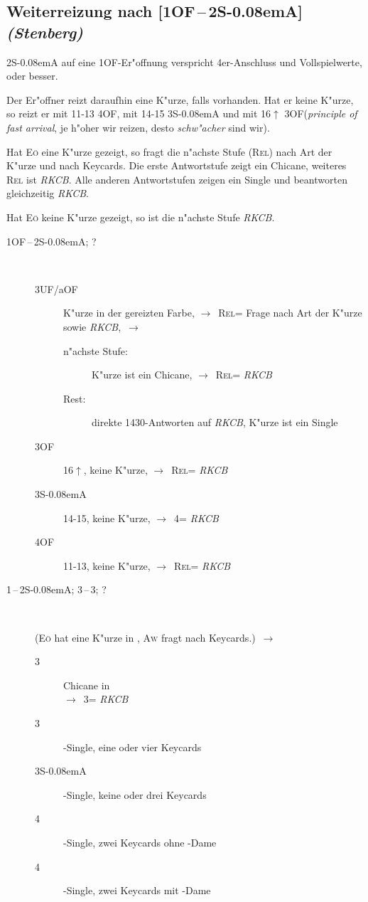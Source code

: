 \documentclass[11pt,german,twocolumn]{scrartcl}
\def\pik{\nobreak\hspace{\cardskip}\Sp\xspace}
\def\coe{\nobreak\hspace{\cardskip}\He\xspace}
\def\kar{\nobreak\hspace{\cardskip}\Di\xspace}
\def\tre{\nobreak\hspace{\cardskip}\Cl\xspace}
\def\co{\He\xspace}
\def\tr{\Cl\xspace}
\def\ra{$\rightarrow$\xspace}
\def\pl{$\uparrow$\xspace}
\def\uf{\nobreak\hspace{\cardskip}\textsf{UF}\xspace}
\def\of{\nobreak\hspace{\cardskip}\textsf{OF}\xspace}
\def\aof{\nobreak\hspace{\cardskip}\textsf{aOF}\xspace}
\def\sa{\nobreak\textsf{S\kern-0.08emA}\xspace}
\def\SA{\nobreak\hspace{\cardskip}\sa}
\def\sep{\,--\,}
\newcommand{\conv}[1]{\emph{#1}}
\def\rel{\textsc{Rel}\xspace}
\def\aw{\textsc{Aw}\xspace}
\def\eo{\textsc{E\"o}\xspace}
\def\bdsc{\begin{description}}
\def\edsc{\end{description}}
\begin{document}
\subsection{Weiterreizung nach [1\of{}\sep2\SA] \conv{(Stenberg)}\label{stenberg}}

2\SA auf eine 1\of-Er"offnung verspricht 4er-Anschluss und
Vollspielwerte, oder besser.

Der Er"offner reizt daraufhin eine K"urze, falls vorhanden. Hat er
keine K"urze, so reizt er mit 11-13 4\of, mit 14-15 3\SA und mit
16\pl 3\of (\conv{principle of fast arrival}, je h"oher wir reizen,
desto \emph{schw"acher} sind wir).

Hat \eo eine K"urze gezeigt, so fragt die n"achste Stufe (\rel) nach
Art der K"urze und nach Keycards.  Die erste Antwortstufe zeigt ein
Chicane, weiteres \rel ist \conv{RKCB}.  Alle anderen Antwortstufen
zeigen ein Single und beantworten gleichzeitig \conv{RKCB}.

Hat \eo keine K"urze gezeigt, so ist die n"achste Stufe \conv{RKCB}.

\bdsc
\item[1\of{}\sep2\SA; ?]~
  \bdsc
  \item[3\uf/\aof] K"urze in der gereizten Farbe, \ra~\rel = Frage
    nach Art der K"urze sowie \conv{RKCB},~\ra
    \bdsc
    \item[n"achste Stufe:] K"urze ist ein Chicane, \ra~\rel = \conv{RKCB}
    \item[Rest:] direkte 1430-Antworten auf
      \conv{RKCB}, K"urze ist ein Single
    \edsc
  \item[3\of] 16\pl, keine K"urze, \ra~\rel = \conv{RKCB}
  \item[3\SA] 14-15, keine K"urze, \ra~4\tre = \conv{RKCB}
  \item[4\of] 11-13, keine K"urze, \ra~\rel = \conv{RKCB}
  \edsc
\item[1\coe{}\sep2\SA; 3\tre{}\sep3\kar; ?]~

  (\eo hat eine K"urze in \tr, \aw fragt nach Keycards.)~\ra
  \bdsc
  \item[3\coe] Chicane in \tre\\
    \ra~3\pik = \conv{RKCB}
  \item[3\pik] \tre-Single, eine oder vier Keycards
  \item[3\SA] \tre-Single, keine oder drei Keycards
  \item[4\tre] \tre-Single, zwei Keycards ohne \co-Dame
  \item[4\kar] \tre-Single, zwei Keycards mit \co-Dame
  \edsc
\edsc
\end{document}
